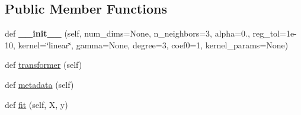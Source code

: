\subsection*{Public Member Functions}
\begin{DoxyCompactItemize}
\item 
def {\bfseries \+\_\+\+\_\+init\+\_\+\+\_\+} (self, num\+\_\+dims=None, n\+\_\+neighbors=3, alpha=0., reg\+\_\+tol=1e-\/10, kernel=\char`\"{}linear\char`\"{}, gamma=\+None, degree=3, coef0=1, kernel\+\_\+params=\+None)\hypertarget{classdml_1_1dmlmj_1_1KDMLMJ_ac8acdf1d02e47508c9c879fa2a7c99ff}{}\label{classdml_1_1dmlmj_1_1KDMLMJ_ac8acdf1d02e47508c9c879fa2a7c99ff}

\item 
def \hyperlink{classdml_1_1dmlmj_1_1KDMLMJ_a18a53c1278081748f9d381deebfbef38}{transformer} (self)
\item 
def \hyperlink{classdml_1_1dmlmj_1_1KDMLMJ_ae88dd077200a6327abb4d1f45855eb66}{metadata} (self)
\item 
def \hyperlink{classdml_1_1dmlmj_1_1KDMLMJ_a6411e45a04c4af41c246f578fc80d539}{fit} (self, X, y)
\end{DoxyCompactItemize}
